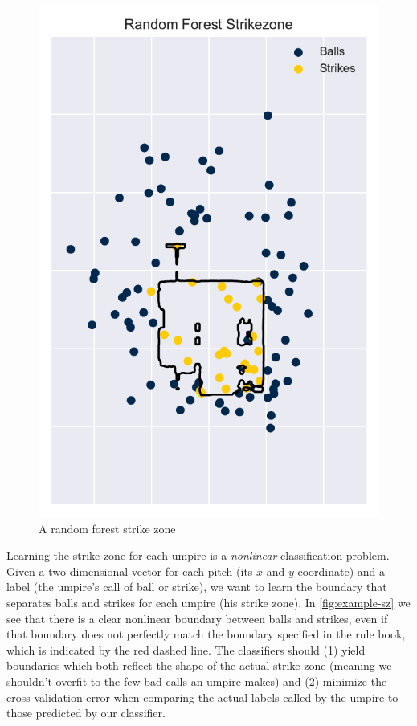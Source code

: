 \documentclass[letterpaper,12pt]{article}
\begin{document}
\begin{figure}
  \includegraphics[scale=0.42]{graphics/RandomForeststrikezone.pdf}
  \caption{A random forest strike zone}
  \label{fig:rf-sz}
  \vspace{-0.64cm}
\end{figure}
Learning the strike zone for each umpire is a \textit{nonlinear} classification problem.
Given a two dimensional vector for each pitch (its $x$ and $y$ coordinate) and a label (the umpire's call of ball or strike), we want to learn the boundary that separates balls and strikes for each umpire (his strike zone).
In \cref{fig:example-sz} we see that there is a clear nonlinear boundary between balls and strikes, even if that boundary does not perfectly match the boundary specified in the rule book, which is indicated by the red dashed line.
The classifiers should (1) yield boundaries which both reflect the shape of the actual strike zone (meaning we shouldn't overfit to the few bad calls an umpire makes) and (2) minimize the cross validation error when comparing the actual labels called by the umpire to those predicted by our classifier.
\end{document}
